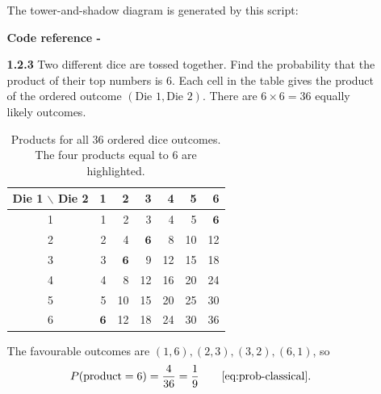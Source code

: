 \begin{enumerate}[label={},leftmargin=0pt]
\begin{enumerate}[label={},leftmargin=0pt,itemsep=9pt]
The tower-and-shadow diagram is generated by this script:
\par\smallskip
\noindent\textbf{Code reference -}
\par\noindent{}
\par\smallskip
\newpage
\setcounter{enumii}{3}
\setcounter{equation}{0}
\item[\textbf{1.2.3}] Two different dice are tossed together. Find the probability that the product of their top numbers is $6$.
\solution Each cell in the table gives the product of the ordered outcome $(\text{Die 1},\text{Die 2})$. There are $6\times6=36$ equally likely outcomes.
\begin{table}[H]\centering\small
\caption{Products for all 36 ordered dice outcomes. The four products equal to 6 are highlighted.}
\setlength{\tabcolsep}{5pt}
\begin{tabular}{c|rrrrrr}
\hline
Die 1 $\backslash$ Die 2 & 1 & 2 & 3 & 4 & 5 & 6\\\hline
1 & 1 & 2 & 3 & 4 & 5 & $\mathbf{6}$\\
2 & 2 & 4 & $\mathbf{6}$ & 8 & 10 & 12\\
3 & 3 & $\mathbf{6}$ & 9 & 12 & 15 & 18\\
4 & 4 & 8 & 12 & 16 & 20 & 24\\
5 & 5 & 10 & 15 & 20 & 25 & 30\\
6 & $\mathbf{6}$ & 12 & 18 & 24 & 30 & 36\\
\hline
\end{tabular}\end{table}
The favourable outcomes are $(1,6),(2,3),(3,2),(6,1)$, so
\begin{equation}
P(\text{product}=6)=\frac4{36}=\frac19\qquad\eqref{eq:prob-classical}.
\end{equation}




\end{enumerate}
\end{enumerate}
